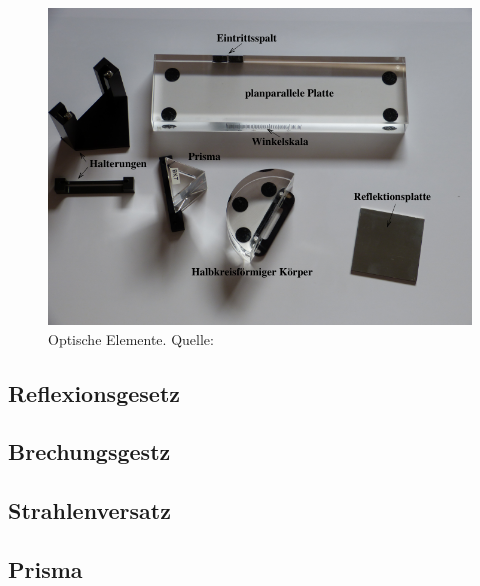 \begin{figure}[H]
    \centering
    \includegraphics[scale = 0.3]{pictures/Teile.png}
    \caption{Optische Elemente. Quelle: \cite{AP01}}
    \label{fig:Teile}
\end{figure}

\subsection{Reflexionsgesetz}
\label{sec:reflexionsmessung}
\subsection{Brechungsgestz}
\label{sec:brechungmessung}
\subsection{Strahlenversatz}
\label{sec:strahlenversatzmessung}
\subsection{Prisma}
\label{sec:prismamessung}
